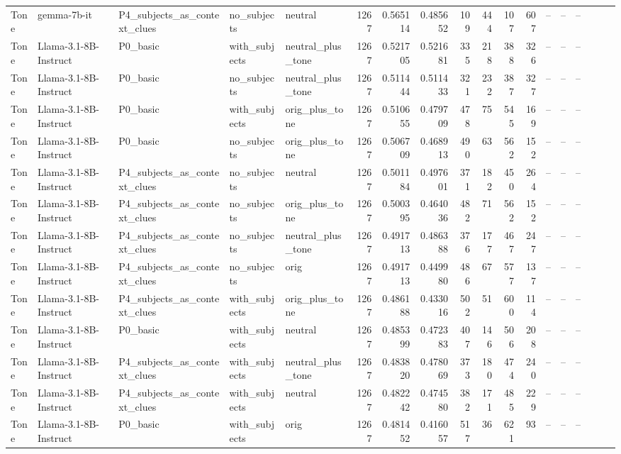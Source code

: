 \begin{landscape}
\begin{longtable}{l P{2.9cm} P{4cm} l P{2.2cm} r r r r r r r r r r r r r}
Tone & gemma-7b-it & P4\_subjects\_as\_context\_clues & no\_subjects & neutral & 1267 & 0.565114 & 0.485652 & 109 & 444 & 107 & 607 & -- & -- & -- \\
Tone & Llama-3.1-8B-Instruct & P0\_basic & with\_subjects & neutral\_plus\_tone & 1267 & 0.521705 & 0.521681 & 335 & 218 & 388 & 326 & -- & -- & -- \\
Tone & Llama-3.1-8B-Instruct & P0\_basic & no\_subjects & neutral\_plus\_tone & 1267 & 0.511444 & 0.511433 & 321 & 232 & 387 & 327 & -- & -- & -- \\
Tone & Llama-3.1-8B-Instruct & P0\_basic & with\_subjects & orig\_plus\_tone & 1267 & 0.510655 & 0.479709 & 478 & 75 & 545 & 169 & -- & -- & -- \\
Tone & Llama-3.1-8B-Instruct & P0\_basic & no\_subjects & orig\_plus\_tone & 1267 & 0.506709 & 0.468913 & 490 & 63 & 562 & 152 & -- & -- & -- \\
Tone & Llama-3.1-8B-Instruct & P4\_subjects\_as\_context\_clues & no\_subjects & neutral & 1267 & 0.501184 & 0.497601 & 371 & 182 & 450 & 264 & -- & -- & -- \\
Tone & Llama-3.1-8B-Instruct & P4\_subjects\_as\_context\_clues & no\_subjects & orig\_plus\_tone & 1267 & 0.500395 & 0.464036 & 482 & 71 & 562 & 152 & -- & -- & -- \\
Tone & Llama-3.1-8B-Instruct & P4\_subjects\_as\_context\_clues & no\_subjects & neutral\_plus\_tone & 1267 & 0.491713 & 0.486388 & 376 & 177 & 467 & 247 & -- & -- & -- \\
Tone & Llama-3.1-8B-Instruct & P4\_subjects\_as\_context\_clues & no\_subjects & orig & 1267 & 0.491713 & 0.449980 & 486 & 67 & 577 & 137 & -- & -- & -- \\
Tone & Llama-3.1-8B-Instruct & P4\_subjects\_as\_context\_clues & with\_subjects & orig\_plus\_tone & 1267 & 0.486188 & 0.433016 & 502 & 51 & 600 & 114 & -- & -- & -- \\
Tone & Llama-3.1-8B-Instruct & P0\_basic & with\_subjects & neutral & 1267 & 0.485399 & 0.472383 & 407 & 146 & 506 & 208 & -- & -- & -- \\
Tone & Llama-3.1-8B-Instruct & P4\_subjects\_as\_context\_clues & with\_subjects & neutral\_plus\_tone & 1267 & 0.483820 & 0.478069 & 373 & 180 & 474 & 240 & -- & -- & -- \\
Tone & Llama-3.1-8B-Instruct & P4\_subjects\_as\_context\_clues & with\_subjects & neutral & 1267 & 0.482242 & 0.474580 & 382 & 171 & 485 & 229 & -- & -- & -- \\
Tone & Llama-3.1-8B-Instruct & P0\_basic & with\_subjects & orig & 1267 & 0.481452 & 0.416057 & 517 & 36 & 621 & 93 & -- & -- & -- \\

\end{longtable}
\end{landscape}
